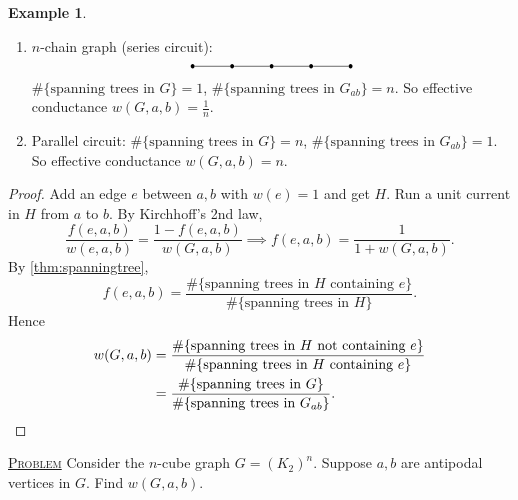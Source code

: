 \documentclass{report}
\newcommand{\fancyem}[1]{\underline{\textsc{#1}}}
\theoremstyle{definition}
\newtheorem{example}{Example}[section]
\theoremstyle{remark}
\numberwithin{equation}{section}
\newcommand{\fnl}{\parbox[t]{0\linewidth}{}}
\begin{document}
\begin{example}\fnl
    \begin{enumerate}
        \item $n$-chain graph (series circuit):
        \[
            \begin{tikzpicture}
                \node[shape=circle, fill=black, scale = 0.3] (A1) at (0, 0) {};
                \node[shape=circle, fill=black, scale = 0.3] (A2) at (1, 0) {};
                \node[shape=circle, fill=black, scale = 0.3] (A3) at (2, 0) {};
                \node[shape=circle, fill=black, scale = 0.3] (A4) at (3, 0) {};
                \node[shape=circle, fill=black, scale = 0.3] (A5) at (4, 0) {};
              
                \draw (A1) -- (A2) -- (A3) -- (A4) -- (A5);
                
            \end{tikzpicture}
        \]
        $\#\{\text{spanning trees in $G$}\} = 1$, $\#\{\text{spanning trees in $G_{ab}$}\} = n$. So effective conductance $w(G, a, b) = \frac{1}{n}$.
        \item Parallel circuit:
        $\#\{\text{spanning trees in $G$}\} = n$, $\#\{\text{spanning trees in $G_{ab}$}\} = 1$. So effective conductance $w(G, a, b) = n$.
    \end{enumerate}
\end{example}

\begin{proof}
    Add an edge $e$ between $a, b$ with $w(e) = 1$ and get $H$.
    Run a unit current in $H$ from $a$ to $b$. By Kirchhoff's 2nd law,
    \[\frac{f(e, a, b)}{w(e, a, b)} = \frac{1 - f(e, a, b)}{w(G, a, b)} \implies f(e, a, b) = \frac{1}{1 + w(G, a, b)}.\]
    By \ref{thm:spanningtree},
    \[
        f(e, a, b) = \frac{\#\{\text{spanning trees in $H$ containing $e$}\}}{\#\{\text{spanning trees in $H$}\}}.
    \]
    Hence \begin{align*}
        w(G, a, b) & = \frac{\#\{\text{spanning trees in $H$ not containing $e$}\}}{\#\{\text{spanning trees in $H$ containing $e$}\}} \\
        & = \frac{\#\{\text{spanning trees in $G$}\}}{\#\{\text{spanning trees in $G_{ab}$}\}}. \qedhere
    \end{align*} 
\end{proof}

\fancyem{Problem} Consider the $n$-cube graph $G = (K_2)^n$. Suppose $a, b$ are antipodal vertices in $G$. Find $w(G, a, b)$.
\end{document}
